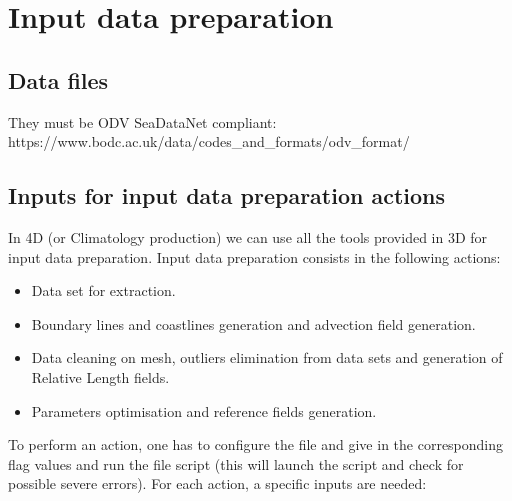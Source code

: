\section{Input data preparation}

\subsection{Data files}

They must be ODV SeaDataNet compliant: https://www.bodc.ac.uk/data/codes\_and\_formats/odv\_format/


\subsection{Inputs for input data preparation actions}

In \diva 4D (or Climatology production) we can use all the tools provided in \diva 3D for input data preparation.
Input data preparation consists in the following actions:

\vspace{-0.5cm}

\begin{itemize}
\item Data set for extraction.
\item Boundary lines and coastlines generation and advection field generation.
\item Data cleaning on mesh, outliers elimination from data sets and generation of Relative Length fields.
\item Parameters optimisation and reference fields generation.
\end{itemize}


To perform an action, one has to configure the  file and give in the corresponding flag values and run the  file script (this will launch the  script and check for possible severe errors). For each action, a specific inputs are needed:



